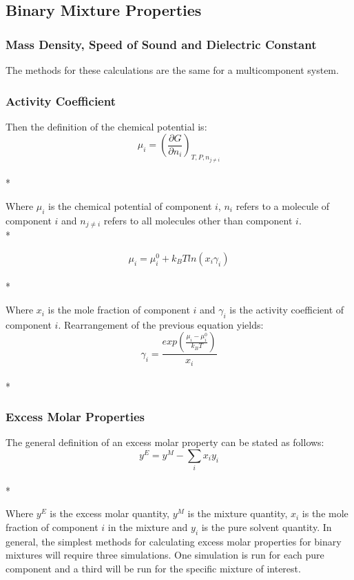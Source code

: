 \documentclass[a4paper,12pt]{article}
\begin{document}
\subsection{Binary Mixture Properties} 
\subsubsection{Mass Density, Speed of Sound and Dielectric Constant}
\noindent The methods for these calculations are the same for a multicomponent system.

\subsubsection{Activity Coefficient}
\noindent Then the definition of the chemical potential is:
\begin{equation}\mu_{i} = \left(\frac{\partial G}{\partial n_{i}}\right)_{T,P,n_{j \neq i}}\end{equation}\\*

\noindent Where $\mu_i$ is the chemical potential of component $i$, $n_i$ refers to a molecule of component $i$ and $n_{j \neq i}$ refers to all molecules other than component $i$.\\*

\begin{equation}\mu_{i} = \mu^0_i + k_B T ln\left(x_i \gamma_i\right)\end{equation}\\*

\noindent Where $x_i$ is the mole fraction of component $i$ and $\gamma_i$ is the activity coefficient of component $i$. Rearrangement of the previous equation yields:
\begin{equation}\gamma_i = \frac{exp\left(\frac{\mu_i - \mu^0_i}{k_B T}\right)}{x_i}\end{equation}\\*

\subsubsection{Excess Molar Properties}
\noindent The general definition of an excess molar property can be stated as follows:
\begin{equation}y^{E} = y^{M} - \sum_{i} x_i y_i\end{equation}\\*

\noindent Where $y^E$ is the excess molar quantity, $y^M$ is the mixture quantity, $x_i$ is the mole fraction of component $i$ in the mixture and $y_i$ is the pure solvent quantity. In general, the simplest methods for calculating excess molar properties for binary mixtures will require three simulations. One simulation is run for each pure component and a third will be run for the specific mixture of interest.
\end{document}
